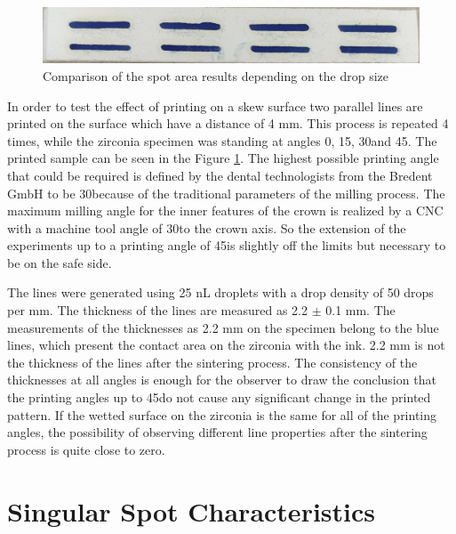 	\bigskip

	\begin{figure}[H]
		\centering
		\includegraphics[width=1\textwidth]{grafiken/angleprint.jpg}
		\caption{Comparison of the spot area results depending on the drop size}
		\label{fig:angleprint}
	\end{figure} 

	\bigskip

In order to test the effect of printing on a skew surface two parallel lines are printed on the surface which have a distance of 4 mm. This process is repeated 4 times, while the zirconia specimen was standing at angles 0\textdegree \space, 15\textdegree \space, 30\textdegree \space and 45\textdegree \space. The printed sample can be seen in the Figure \ref{fig:angleprint}. The highest possible printing angle that could be required is defined by the dental technologists from the Bredent GmbH to be 30\textdegree \space because of the traditional parameters of the milling process. The maximum milling angle for the inner features of the crown is realized by a CNC with a machine tool angle of 30\textdegree \space to the crown axis. So the extension of the experiments up to a printing angle of 45\textdegree \space is slightly off the limits but necessary to be on the safe side.

The lines were generated using 25 nL droplets with a drop density of 50 drops per mm. The thickness of the lines are measured as 2.2 $\pm$ 0.1 mm. The measurements of the thicknesses as 2.2 mm on the specimen belong to the blue lines, which present the contact area on the zirconia with the ink. 2.2 mm is not the thickness of the lines after the sintering process. The consistency of the thicknesses at all angles is enough for the observer to draw the conclusion that the printing angles up to 45\textdegree \space do not cause any significant change in the printed pattern. If the wetted surface on the zirconia is the same for all of the printing angles, the possibility of observing different line properties after the sintering process is quite close to zero.

\section{Singular Spot Characteristics}

